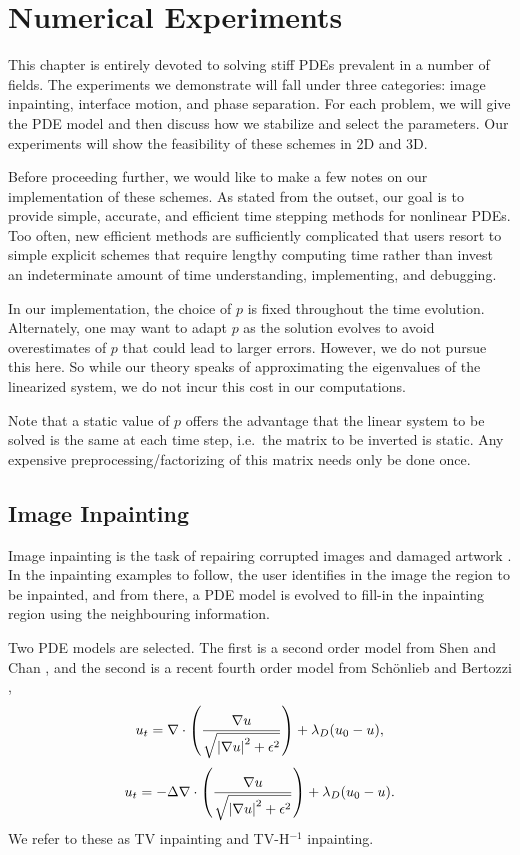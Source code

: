 \chapter{Numerical Experiments}
\label{chap:num experiments}
This chapter is entirely devoted to solving stiff PDEs prevalent in a number of fields. The experiments we demonstrate will fall under three categories: image inpainting, interface motion, and phase separation. For each problem, we will give the PDE model and then discuss how we stabilize and select the parameters. Our experiments will show the feasibility of these schemes in 2D and 3D. 

Before proceeding further, we would like to make a few notes on our implementation of these schemes. As stated from the outset, our goal is to provide simple, accurate, and efficient time stepping methods for nonlinear PDEs. Too often, new efficient methods are sufficiently complicated that users resort to simple explicit schemes that require lengthy computing time rather than invest an indeterminate amount of time understanding, implementing, and debugging.

In our implementation, the choice of $p$ is fixed throughout the time evolution. Alternately, one may want to adapt $p$ as the solution evolves to avoid overestimates of $p$ that could lead to larger errors. However, we do not pursue this here. So while our theory speaks of approximating the eigenvalues of the linearized system, we do not incur this cost in our computations. 

Note that a static value of $p$ offers the advantage that the linear system to be solved is the same at each time step, i.e.\ the matrix to be inverted is static. Any expensive preprocessing/factorizing of this matrix needs only be done once.

\section{Image Inpainting}
Image inpainting is the task of repairing corrupted images and damaged artwork \cite{bertalmio2000image}. In the inpainting examples to follow, the user identifies in the image the region to be inpainted, and from there, a PDE model is evolved to fill-in the inpainting region using the neighbouring information.

Two PDE models are selected. The first is a second order model from Shen and Chan \cite{shen2002mathematical}, and the second is a recent fourth order model from Sch{\"o}nlieb and Bertozzi \cite{schonlieb2011unconditionally},
\begin{align}
        u_t  = \nabla \cdot \left(\frac{\nabla u}{\sqrt{\left|\nabla u\right|^2 + \epsilon^2}} \right) 
+ \lambda_D(u_0 - u), 
\label{bv inpaint}
\end{align}
\begin{align}
         u_t  = -\Delta \nabla \cdot \left(\frac{\nabla u}{\sqrt{\left|\nabla u\right|^2 + \epsilon^2}} \right) 
+ \lambda_D(u_0 - u).
\label{tvhneg inpaint}
\end{align}
We refer to these as TV inpainting and TV-H$^{-1}$ inpainting.

